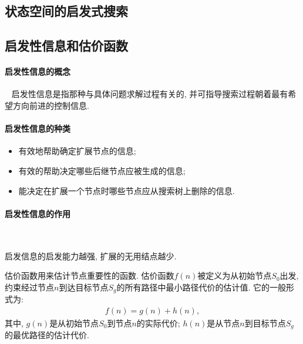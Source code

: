 \subsection{状态空间的启发式搜索}
\subsection{启发性信息和估价函数}
\paragraph{启发性信息的概念}~{}
启发性信息是指那种与具体问题求解过程有关的, 并可指导搜索过程朝着最有希望方向前进的控制信息.

\paragraph{启发性信息的种类}
\begin{itemize}
\item 有效地帮助确定扩展节点的信息;
\item 有效的帮助决定哪些后继节点应被生成的信息;
\item 能决定在扩展一个节点时哪些节点应从搜索树上删除的信息.
\end{itemize}
\paragraph{启发性信息的作用}~{}

启发信息的启发能力越强, 扩展的无用结点越少.

估价函数用来估计节点重要性的函数. 估价函数$f(n)$被定义为从初始节点$S_0$出发, 约束经过节点$n$到达目标节点$S_g$的所有路径中最小路径代价的估计值. 它的一般形式为:
\begin{align}
  f(n)=g(n)+h(n),
\end{align}
其中, $g(n)$是从初始节点$S_0$到节点$n$的实际代价; $h(n)$是从节点$n$到目标节点$S_g$的最优路径的估计代价.
